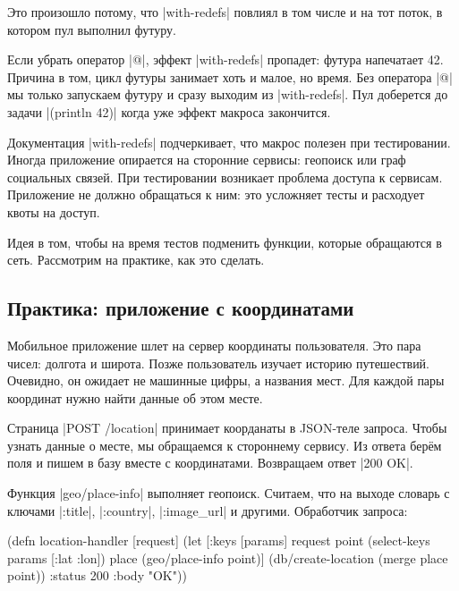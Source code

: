 Это произошло потому, что \spverb|with-redefs| повлиял в том числе и на тот
поток, в котором пул выполнил футуру.

Если убрать оператор \spverb|@|, эффект \spverb|with-redefs| пропадет: футура
напечатает 42. Причина в том, цикл футуры занимает хоть и малое, но время. Без
оператора \spverb|@| мы только запускаем футуру и сразу выходим из
\spverb|with-redefs|. Пул доберется до задачи \spverb|(println 42)| когда уже
эффект макроса закончится.

Документация \spverb|with-redefs| подчеркивает, что макрос полезен при
тестировании. Иногда приложение опирается на сторонние сервисы: геопоиск или
граф социальных связей. При тестировании возникает проблема доступа к
сервисам. Приложение не должно обращаться к ним: это усложняет тесты и расходует
квоты на доступ.

Идея в том, чтобы на время тестов подменить функции, которые обращаются в
сеть. Рассмотрим на практике, как это сделать.

\subsection{Практика: приложение с координатами}


Мобильное приложение шлет на сервер координаты пользователя. Это пара чисел:
долгота и широта. Позже пользователь изучает историю путешествий. Очевидно, он
ожидает не машинные цифры, а названия мест. Для каждой пары координат нужно
найти данные об этом месте.

Страница \spverb|POST /location| принимает коорданаты в JSON-теле запроса. Чтобы
узнать данные о месте, мы обращаемся к стороннему сервису. Из ответа бер\"{е}м
поля и пишем в базу вместе с координатами. Возвращаем ответ \spverb|200 OK|.

Функция \spverb|geo/place-info| выполняет геопоиск. Считаем, что на выходе
словарь с ключами \spverb|:title|, \spverb|:country|, \spverb|:image_url| и
другими. Обработчик запроса:

\begin{english}
  \begin{clojure}
(defn location-handler [request]
  (let [{:keys [params]} request
        point (select-keys params [:lat :lon])
        place (geo/place-info point)]
    (db/create-location (merge place point))
    {:status 200 :body "OK"}))
  \end{clojure}
\end{english}

